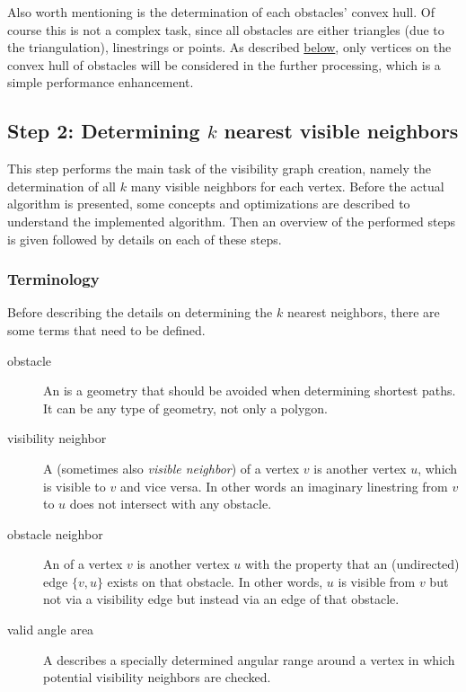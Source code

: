 		Also worth mentioning is the determination of each obstacles' convex hull.
		Of course this is not a complex task, since all obstacles are either triangles (due to the triangulation), linestrings or points.
		As described \hyperref[subsubsec:convex-hull]{below}, only vertices on the convex hull of obstacles will be considered in the further processing, which is a simple performance enhancement.
			
	\subsection{Step 2: Determining $k$ nearest visible neighbors}
	\label{subsec:step-2-knn-search}
			
		This step performs the main task of the visibility graph creation, namely the determination of all $k$ many visible neighbors for each vertex.
		Before the actual algorithm is presented, some concepts and optimizations are described to understand the implemented algorithm.
		Then an overview of the performed steps is given followed by details on each of these steps.
		
		\subsubsection{Terminology}
		
			Before describing the details on determining the $k$ nearest neighbors, there are some terms that need to be defined.
			
			\begin{description}
				\item[obstacle] An  is a geometry that should be avoided when determining shortest paths. It can be any type of geometry, not only a polygon.
				\item[visibility neighbor] A  (sometimes also \emph{visible neighbor}) of a vertex $v$ is another vertex $u$, which is visible to $v$ and vice versa. In other words an imaginary linestring from $v$ to $u$ does not intersect with any obstacle.
				\item[obstacle neighbor] An  of a vertex $v$ is another vertex $u$ with the property that an (undirected) edge $\{v, u\}$ exists on that obstacle. In other words, $u$ is visible from $v$ but not via a visibility edge but instead via an edge of that obstacle.
				\item[valid angle area] A  describes a specially determined angular range around a vertex in which potential visibility neighbors are checked.
			\end{description}
		
